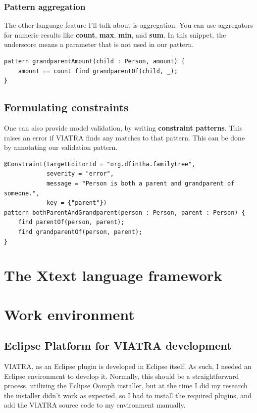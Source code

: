 \documentclass[11pt,a4paper,oneside]{report}
\begin{document}
\subsubsection{Pattern aggregation}
The other language feature I'll talk about is aggregation. You can use
aggregators for numeric results like \textbf{count}, \textbf{max}, \textbf{min},
and \textbf{sum}. In this snippet, the underscore means a parameter that is not
used in our pattern.

\begin{lstlisting}[frame=single]
pattern grandparentAmount(child : Person, amount) {
    amount == count find grandparentOf(child, _);
}
\end{lstlisting}

\subsection{Formulating constraints}
One can also provide model validation, by writing \textbf{constraint patterns}.
This raises an error if VIATRA finds any matches to that pattern. This can be
done by annotating our validation pattern.

\begin{lstlisting}[frame=single]
@Constraint(targetEditorId = "org.dfintha.familytree",
            severity = "error",
            message = "Person is both a parent and grandparent of someone.",
            key = {"parent"})
pattern bothParentAndGrandparent(person : Person, parent : Person) {
    find parentOf(person, parent);
    find grandparentOf(person, parent);
}
\end{lstlisting}

\section{The Xtext language framework}

\section{Work environment}
\subsection{Eclipse Platform for VIATRA development}
VIATRA, as an Eclipse plugin is developed in Eclipse itself. As such, I needed
an Eclipse environment to develop it. Normally, this should be a straightforward
process, utilizing the Eclipse Oomph installer, but at the time I did my
research the installer didn't work as expected, so I had to install the required
plugins, and add the VIATRA source code to my environment manually.
\end{document}
